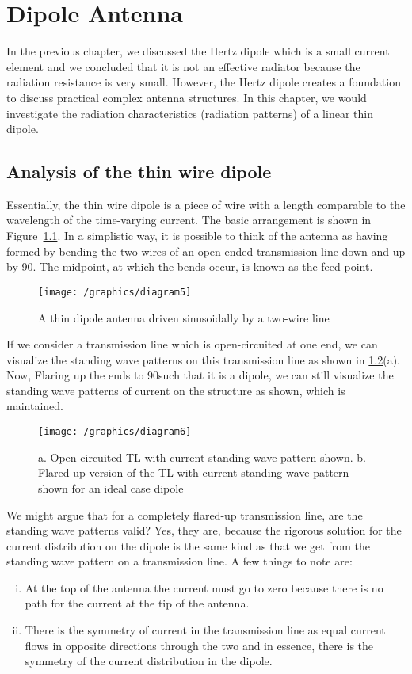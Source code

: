 \chapter{Dipole Antenna}\label{lec:lec50}
In the previous chapter, we discussed the Hertz dipole which is a small current element and we concluded that it is not an effective radiator because the radiation resistance is very small. However, the Hertz dipole creates a foundation to discuss practical complex antenna structures. In this chapter, we would investigate the radiation characteristics (radiation patterns) of a linear thin dipole.

\section{Analysis of the thin wire dipole}
Essentially, the thin wire dipole is a piece of wire with a length comparable to the wavelength of the time-varying current. The basic arrangement is shown in Figure~\ref{fig:thindipole}. In a simplistic way, it is possible to think of the antenna as having formed by bending the two wires of an open-ended transmission line down and up by 90\textdegree. The midpoint, at which the bends occur, is known as the feed point.
\begin{figure}[h]
\centering
\texttt{[image: /graphics/diagram5]}
\caption{A thin dipole antenna driven sinusoidally by a two-wire line}
\label{fig:thindipole}
\end{figure}

If we consider a transmission line which is open-circuited at one end, we can visualize the standing wave patterns on this transmission line as shown in \ref{fig:flaredtl}(a). Now, Flaring up the ends to 90\textdegree such that it is a dipole, we can still visualize the standing wave patterns of current on the structure as shown, which is maintained.
\begin{figure}[h]
\centering
\texttt{[image: /graphics/diagram6]}
\caption{a. Open circuited TL with current standing wave pattern shown.           
 b. Flared up version of the TL with current standing wave pattern shown for an ideal case dipole}
\label{fig:flaredtl}
\end{figure}

We might argue that for a completely flared-up transmission line, are the standing wave patterns valid? Yes, they are, because the rigorous solution for the current distribution on the dipole is the same kind as that we get from the standing wave pattern on a transmission line. A few things to note are:
\begin{enumerate}[(i)]
\item  At the top of the antenna the current must go to zero because there is no path for the current at the tip of the antenna.
\item  There is the symmetry of current in the transmission line as equal current flows in opposite directions through the two and in essence, there is the symmetry of the current distribution in the dipole. 
\end{enumerate}


